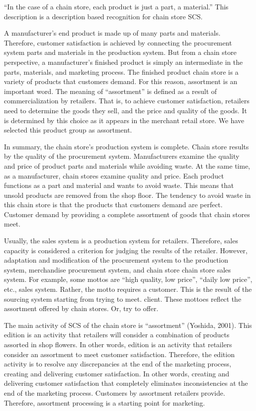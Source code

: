 \documentclass[12pt,]{article}
\begin{document}
``In the case of a chain store, each product is just a part, a
material.'' This description is a description based recognition for
chain store SCS.

A manufacturer's end product is made up of many parts and materials.
Therefore, customer satisfaction is achieved by connecting the
procurement system parts and materials in the production system. But
from a chain store perspective, a manufacturer's finished product is
simply an intermediate in the parts, materials, and marketing process.
The finished product chain store is a variety of products that customers
demand. For this reason, assortment is an important word. The meaning of
``assortment'' is defined as a result of commercialization by retailers.
That is, to achieve customer satisfaction, retailers need to determine
the goods they sell, and the price and quality of the goods. It is
determined by this choice as it appears in the merchant retail store. We
have selected this product group as assortment.

In summary, the chain store's production system is complete. Chain store
results by the quality of the procurement system. Manufacturers examine
the quality and price of product parts and materials while avoiding
waste. At the same time, as a manufacturer, chain stores examine quality
and price. Each product functions as a part and material and wants to
avoid waste. This means that unsold products are removed from the shop
floor. The tendency to avoid waste in this chain store is that the
products that customers demand are perfect. Customer demand by providing
a complete assortment of goods that chain stores meet.

Usually, the sales system is a production system for retailers.
Therefore, sales capacity is considered a criterion for judging the
results of the retailer. However, adaptation and modification of the
procurement system to the production system, merchandise procurement
system, and chain store chain store sales system. For example, some
mottos are ``high quality, low price'', ``daily low price'', etc., sales
system. Rather, the motto requires a customer. This is the result of the
sourcing system starting from trying to meet. client. These mottoes
reflect the assortment offered by chain stores. Or, try to offer.

The main activity of SCS of the chain store is ``assortment'' (Yoshida,
2001). This edition is an activity that retailers will consider a
combination of products assorted in shop flowers. In other words,
edition is an activity that retailers consider an assortment to meet
customer satisfaction. Therefore, the edition activity is to resolve any
discrepancies at the end of the marketing process, creating and
delivering customer satisfaction. In other words, creating and
delivering customer satisfaction that completely eliminates
inconsistencies at the end of the marketing process. Customers by
assortment retailers provide. Therefore, assortment processing is a
starting point for marketing.
\end{document}
